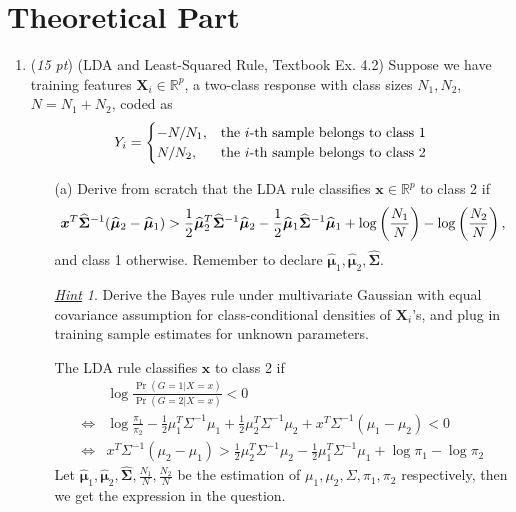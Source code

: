 \documentclass[10pt]{article}
\theoremstyle{definition}
\theoremstyle{remark}
\newtheorem*{hint}{\underline{Hint}}
\newcommand{\bx}{\bm{x}}
\newcommand{\bX}{\bm{X}}
\newcommand{\bmu}{\bm{\mu}}
\newcommand{\bSigma}{\bm{\Sigma}}
\newcommand{\bbR}{\mathbb{R}}
\begin{document}
\section*{Theoretical Part}
\begin{enumerate}
	\item (\textit{15 pt}) (LDA and Least-Squared Rule, Textbook Ex. 4.2) Suppose we have training features $ \bX_{i} \in \bbR^{p} $, a two-class response with class sizes $ N_{1},N_{2} $, $ N = N_{1} + N_{2} $, coded as 
	\[ Y_{i} = \begin{cases}
	-N/N_{1}, & \text{the $ i $-th sample belongs to class 1}\\
	N/N_{2}, & \text{the $ i $-th sample belongs to class 2}
	\end{cases} \]
	\begin{itemize}
		\item [(a)] Derive from scratch that the LDA rule classifies $ \bx \in \bbR^{p} $ to class 2 if
		\[ \bx^{T}\widehat{\bSigma}^{-1}(\widehat{\bmu}_{2} - \widehat{\bmu}_{1}) > {1 \over 2}\widehat{\bmu}_{2}^{T}\widehat{\bSigma}^{-1}\widehat{\bmu}_{2} - {1 \over 2}\widehat{\bmu}_{1}\widehat{\bSigma}^{-1}\widehat{\bmu}_{1} + \log\left( {N_{1} \over N} \right) - \log\left( {N_{2} \over N} \right), \]
		and class 1 otherwise. Remember to declare $ \widehat{\bmu}_{1},\widehat{\bmu}_{2},\widehat{\bSigma} $.
		\begin{hint}
			Derive the Bayes rule under multivariate Gaussian with equal covariance assumption for class-conditional densities of $ \bX_{i} $'s, and plug in training sample estimates for unknown parameters.
		\end{hint}
		
		The LDA rule classifies $ \bx $ to class 2 if
		\begin{align*}
		    & \log \frac{\Pr (G=1 | X=x)}{\Pr (G=2|X=x)} < 0 \\
		    \iff & \log \frac{\pi_1}{\pi_2} - \frac{1}{2} \mu_1^T \Sigma^{-1} \mu_1 + \frac{1}{2} \mu_2^T \Sigma^{-1} \mu_2 + x^T\Sigma^{-1}(\mu_1-\mu_2) < 0 \\
		    \iff & x^T\Sigma^{-1}(\mu_2-\mu_1) > \frac{1}{2} \mu_2^T \Sigma^{-1} \mu_2 - \frac{1}{2} \mu_1^T \Sigma^{-1} \mu_1 + \log \pi_1 - \log \pi_2
		\end{align*}
		Let $ \widehat{\bmu}_{1},\widehat{\bmu}_{2},\widehat{\bSigma}, \frac{N_1}{N}, \frac{N_2}{N} $ be the estimation of $ \mu_1,\mu_2,\Sigma, \pi_1,\pi_2 $ respectively, then we get the expression in the question.
	

\end{itemize}
\end{enumerate}
\end{document}
